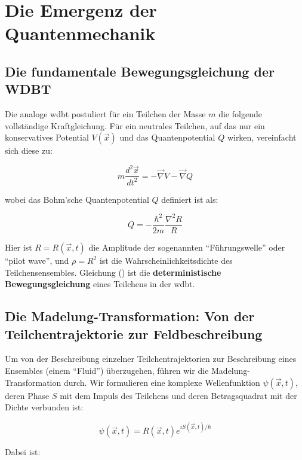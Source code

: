 \chapter{Die Emergenz der Quantenmechanik}
\section{Die fundamentale Bewegungsgleichung der WDBT}
Die analoge \gls{wdbt} postuliert für ein Teilchen der Masse $m$ die folgende vollständige Kraftgleichung. Für ein neutrales Teilchen, auf das nur ein konservatives Potential $V(\vec{x})$ und das
Quantenpotential $Q$ wirken, vereinfacht sich diese zu:

\begin{equation}
    \label{eq:deterministische_bewegungsgleichung}
    m \frac{d^2\vec{x}}{dt^2} = -\vec{\nabla} V - \vec{\nabla} Q
\end{equation}

wobei das Bohm'sche Quantenpotential $Q$ definiert ist als:

\begin{equation}
    \label{eq:quantenpotential}
    Q = -\frac{\hbar^2}{2m} \frac{\nabla^2 R}{R}
\end{equation}

Hier ist $R = R(\vec{x},t)$ die Amplitude der sogenannten \enquote{Führungswelle} oder \enquote{pilot wave}, und $\rho = R^2$ ist die Wahrscheinlichkeitsdichte des Teilchensensembles. Gleichung
() ist die \textbf{deterministische Bewegungsgleichung} eines Teilchens in der \gls{wdbt}.

\section{Die Madelung-Transformation: Von der Teilchentrajektorie zur Feldbeschreibung}
\label{sec:madelung}
Um von der Beschreibung einzelner Teilchentrajektorien zur Beschreibung eines Ensembles (einem \enquote{Fluid}) überzugehen, führen wir die Madelung-Transformation durch. Wir formulieren eine komplexe
Wellenfunktion $\psi(\vec{x}, t)$, deren Phase $S$ mit dem Impuls des Teilchens und deren Betragsquadrat mit der Dichte verbunden ist:

\begin{equation}
    \psi(\vec{x}, t) = R(\vec{x}, t)  e^{i S(\vec{x}, t) / \hbar}
\end{equation}

Dabei ist:

